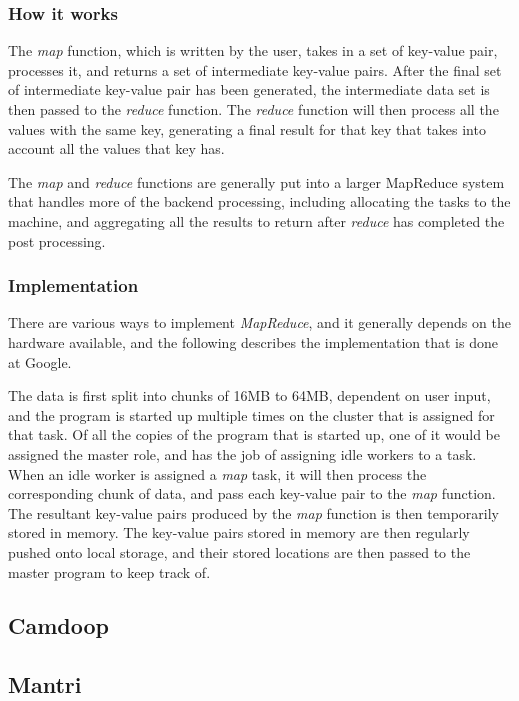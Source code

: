 \documentclass[]{article}
\begin{document}
\subsubsection{How it works}
The \emph{map} function, which is written by the user, takes in a set of key-value pair, processes it, and returns a set of intermediate key-value pairs. After the final set of intermediate key-value pair has been generated, the intermediate data set is then passed to the \emph{reduce} function. The \emph{reduce} function will then process all the values with the same key, generating a final result for that key that takes into account all the values that key has.

The \emph{map} and \emph{reduce} functions are generally put into a larger MapReduce system that handles more of the backend processing, including allocating the tasks to the machine, and aggregating all the results to return after \emph{reduce} has completed the post processing.


\subsubsection{Implementation}
There are various ways to implement \emph{MapReduce}, and it generally depends on the hardware available, and the following describes the implementation that is done at Google.

The data is first split into chunks of 16MB to 64MB, dependent on user input, and the program is started up multiple times on the cluster that is assigned for that task. Of all the copies of the program that is started up, one of it would be assigned the master role, and has the job of assigning idle workers to a task. When an idle worker is assigned a \emph{map} task, it will then process the corresponding chunk of data, and pass each key-value pair to the \emph{map} function. The resultant key-value pairs produced by the \emph{map} function is then temporarily stored in memory. The key-value pairs stored in memory are then regularly pushed onto local storage, and their stored locations are then passed to the master program to keep track of.

\subsection{Camdoop}

\subsection{Mantri}
\end{document}
